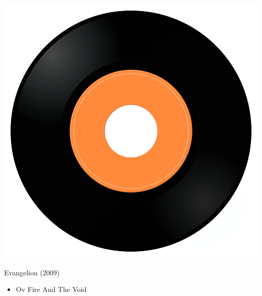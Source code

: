 \begin{minipage}[t]{0.25\textwidth}\vspace{0pt}
\captionsetup{type=figure}
\includegraphics[width=\textwidth]{Images/cover.png}
\caption*{Evangelion (2009)}
\end{minipage}
\begin{minipage}[t]{0.25\textwidth}\vspace{0pt}
\begin{itemize}[nosep,leftmargin=1em,labelwidth=*,align=left]
	\setlength{\itemsep}{0pt}
	\item Ov Fire And The Void
\end{itemize}
\end{minipage}
